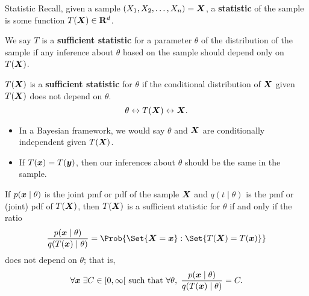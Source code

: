 \begin{Definition}{Statistic}{}
    Recall, given a sample $ (X_1,X_2,\ldots,X_n)=\bm{X} $,
    a \textbf{statistic} of the sample is some function
    $ T(\bm{X})\in\mathbf{R}^d $.
\end{Definition}
\begin{Definition}{}{}
    We say $ T $ is a \textbf{sufficient statistic} for
    a parameter $ \theta $ of the distribution of the sample
    if any inference about $ \theta $ based on the sample should depend
    only on $ T(\bm{X}) $.
\end{Definition}
\begin{Definition}{}{}
    $ T(\bm{X}) $ is a \textbf{sufficient statistic} for $ \theta $
    if the conditional distribution of $ \bm{X} $
    given $ T(\bm{X}) $ does not depend on $ \theta $.
    \[ \theta\leftrightarrow T(\bm{X})\leftrightarrow \bm{X}. \]
    \tcblower{}
    \begin{itemize}
        \item In a Bayesian framework, we would say $ \theta $ and $ \bm{X} $
              are conditionally independent given $ T(\bm{X}) $.
        \item If $ T(\bm{x})=T(\bm{y}) $, then our inferences about
              $ \theta $ should be the same in the sample.
    \end{itemize}
\end{Definition}
\begin{Theorem}{}{}
    If $ p(\bm{x}\mid \theta) $ is the joint pmf or pdf of the sample
    $ \bm{X} $ and $ q(t\mid \theta) $  is the pmf or (joint)
    pdf of $ T(\bm{X}) $, then $ T(\bm{X}) $ is a sufficient statistic
    for $ \theta $ if and only if the ratio
    \[ \frac{p(\Vector{x}\mid \theta)}{q(T(\Vector{x})\mid \theta)}
        =\Prob{\Set{\Vector{X}=\Vector{x}}\given \Set{T(\Vector{X})=T(\Vector{x})}} \]
    does not depend on $ \theta $; that is,
    \[ \forall \Vector{x}\; \exists C\in\interval[open right]{0}{\infty}
        \text{ such that }\forall \theta,\; \frac{p(\Vector{x}\mid \theta)}{q(T(\Vector{x})\mid \theta)}=C. \]
\end{Theorem}
